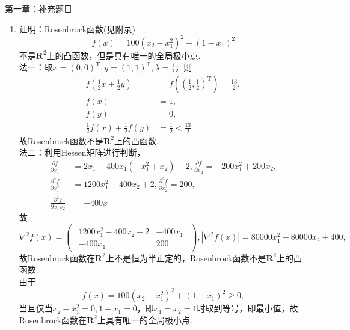 {\heiti 第一章：补充题目}
\begin{enumerate}
    \item 证明：Rosenbrock函数(见附录)\[f(x)=100(x_2-x_1^2)^2+(1-x_1)^2\]不是$\mathbf{R}^2$上的凸函数，但是具有唯一的全局极小点.\\
    \pro 法一：取$\displaystyle x=(0,0)^{\mathrm{T}},y=(1,1)^{\mathrm{T}},\lambda = \frac{1}{2}$，则
    \begin{align*}
        f \left(\frac{1}{2}x+\frac{1}{2}y\right) & = f\left(\left(\frac{1}{2},\frac{1}{2}\right)^{\mathrm{T}}\right) = \frac{13}{2},\\
        f(x) & = 1,\\
        f(y) & = 0,\\
        \frac{1}{2}f(x)+\frac{1}{2}f(y) & = \frac{1}{2} < \frac{13}{2}
    \end{align*}
    故Rosenbrock函数不是$\mathbf{R}^2$上的凸函数.\\
    法二：利用Hessen矩阵进行判断，
    \begin{align*}
        \frac{\partial f}{\partial x_1} & = 2x_1 - 400x_1(- x_1^2 + x_2) - 2, \frac{\partial f}{\partial x_2} = - 200x_1^2 + 200x_2,\\
        \frac{\partial^2 f}{\partial x_1^2} & = 1200x_1^2 - 400x_2 + 2, \frac{\partial^2 f}{\partial x_2^2} = 200,\\
        \frac{\partial^2 f}{\partial x_1x_2} & = -400x_1
    \end{align*}
    故
    \[\nabla^2 f(x) = \left(\begin{array}{cc}
        \begin{matrix}
            1200x_1^2 - 400x_2 + 2 & -400x_1 \\ -400x_1 & 200
        \end{matrix}
    \end{array}\right), |\nabla^2 f(x)| = 80000x_1^2 - 80000x_2 + 400,\]
    故Rosenbrock函数在$\mathbf{R}^2$上不是恒为半正定的，Rosenbrock函数不是$\mathbf{R}^2$上的凸函数.\\
    由于
    \[f(x)=100(x_2-x_1^2)^2+(1-x_1)^2 \geqslant 0,\]
    当且仅当$x_2-x_1^2 = 0, 1-x_1 = 0$，即$x_1=x_2=1$时取到等号，即最小值，故Rosenbrock函数在$\mathbf{R}^2$上具有唯一的全局极小点.
\end{enumerate}
\clearpage